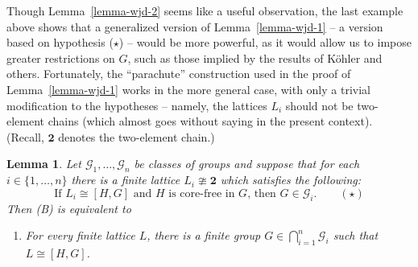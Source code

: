 \documentclass[cm,dissertation,actual,final]{uhthesis}
\theoremstyle{plain}
\newtheorem{lemma}[theorem]{Lemma}
\theoremstyle{definition}
\theoremstyle{remark}
\numberwithin{theorem}{section}
\numberwithin{claim}{chapter}
\numberwithin{equation}{section}
\numberwithin{conjecture}{chapter}
\newcommand{\<}{\ensuremath{\langle}}
\renewcommand{\>}{\ensuremath{\rangle}}
\newcommand{\0}{\ensuremath{\mathbf{0}}}
\newcommand{\1}{\ensuremath{\mathbf{1}}}
\newcommand{\2}{\ensuremath{\mathbf{2}}}
\newcommand{\3}{\ensuremath{\mathbf{3}}}
\newcommand{\4}{\ensuremath{\mathbf{4}}}
\newcommand{\5}{\ensuremath{\mathbf{5}}}
\newcommand{\sG}{\ensuremath{\mathscr{G}}}
\newcommand{\two}{\ensuremath{\mathbf{2}}}
\begin{document}
Though Lemma~\ref{lemma-wjd-2} seems like a useful observation, the last example
above shows that a 
generalized version of Lemma~\ref{lemma-wjd-1} -- a version based on hypothesis ($\star$) --
would be more powerful, as it would allow us to impose greater restrictions on $G$,
such as those implied by the results of K\"ohler and others.  
Fortunately, the ``parachute''
construction used in the proof of Lemma~\ref{lemma-wjd-1} works in the more general case,
with only a trivial modification to the hypotheses -- namely, the lattices $L_i$
should not be two-element chains (which almost goes without saying in the present context).  
(Recall, $\two$ denotes the two-element chain.)
\begin{lemma}
\label{lemma-wjd-3}
Let $\sG_1, \dots, \sG_n$ be classes of groups and  
suppose that for each $i\in \{1, \dots, n\}$ there is a finite lattice $L_i\ncong \two$
which satisfies the following:  %
\[
\text{If $L_i\cong [H,G]$ and $H$ is core-free in $G$, then $G\in
  {\sG_i}$}. \qquad (\star)
\]
Then (B) is equivalent to
  \begin{enumerate}
  \item[(C)] For every finite lattice $L$, there is a finite group $G \in
    \bigcap\limits_{i=1}^n \sG_i$ such that $L \cong [H,G]$.
  \end{enumerate}
\end{lemma}
\end{document}
